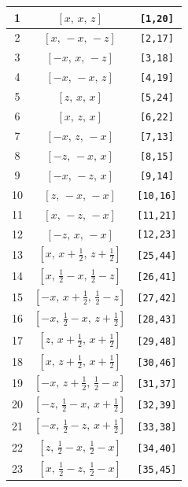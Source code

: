 \documentclass[fleqn,8pt]{jsarticle}
\begin{document}
\begin{longtable}{ccc}
1 & $\left[ x,\, x,\, z \right]$ & {\tt [1,20]} \\ \hline
2 & $\left[ x,\, - x,\, - z \right]$ & {\tt [2,17]} \\ \hline
3 & $\left[ - x,\, x,\, - z \right]$ & {\tt [3,18]} \\ \hline
4 & $\left[ - x,\, - x,\, z \right]$ & {\tt [4,19]} \\ \hline
5 & $\left[ z,\, x,\, x \right]$ & {\tt [5,24]} \\ \hline
6 & $\left[ x,\, z,\, x \right]$ & {\tt [6,22]} \\ \hline
7 & $\left[ - x,\, z,\, - x \right]$ & {\tt [7,13]} \\ \hline
8 & $\left[ - z,\, - x,\, x \right]$ & {\tt [8,15]} \\ \hline
9 & $\left[ - x,\, - z,\, x \right]$ & {\tt [9,14]} \\ \hline
10 & $\left[ z,\, - x,\, - x \right]$ & {\tt [10,16]} \\ \hline
11 & $\left[ x,\, - z,\, - x \right]$ & {\tt [11,21]} \\ \hline
12 & $\left[ - z,\, x,\, - x \right]$ & {\tt [12,23]} \\ \hline
13 & $\left[ x,\, x + \frac{1}{2},\, z + \frac{1}{2} \right]$ & {\tt [25,44]} \\ \hline
14 & $\left[ x,\, \frac{1}{2} - x,\, \frac{1}{2} - z \right]$ & {\tt [26,41]} \\ \hline
15 & $\left[ - x,\, x + \frac{1}{2},\, \frac{1}{2} - z \right]$ & {\tt [27,42]} \\ \hline
16 & $\left[ - x,\, \frac{1}{2} - x,\, z + \frac{1}{2} \right]$ & {\tt [28,43]} \\ \hline
17 & $\left[ z,\, x + \frac{1}{2},\, x + \frac{1}{2} \right]$ & {\tt [29,48]} \\ \hline
18 & $\left[ x,\, z + \frac{1}{2},\, x + \frac{1}{2} \right]$ & {\tt [30,46]} \\ \hline
19 & $\left[ - x,\, z + \frac{1}{2},\, \frac{1}{2} - x \right]$ & {\tt [31,37]} \\ \hline
20 & $\left[ - z,\, \frac{1}{2} - x,\, x + \frac{1}{2} \right]$ & {\tt [32,39]} \\ \hline
21 & $\left[ - x,\, \frac{1}{2} - z,\, x + \frac{1}{2} \right]$ & {\tt [33,38]} \\ \hline
22 & $\left[ z,\, \frac{1}{2} - x,\, \frac{1}{2} - x \right]$ & {\tt [34,40]} \\ \hline
23 & $\left[ x,\, \frac{1}{2} - z,\, \frac{1}{2} - x \right]$ & {\tt [35,45]} \\ \hline

\end{longtable}
\end{document}
